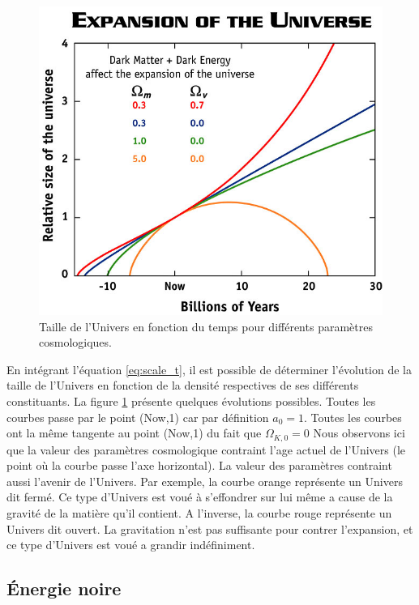\begin{figure}[bth]
        \includegraphics[width=.9\linewidth]{img/01/scale_t.jpg} 
        \caption{Taille de l'Univers en fonction du temps pour différents paramètres cosmologiques.
        }
 		\label{fig:scale_t}
\end{figure}

En intégrant l’équation \ref{eq:scale_t}, il est possible de déterminer l'évolution de la taille de l'Univers en fonction de la densité respectives de ses différents constituants.
La figure \ref{fig:scale_t} présente quelques évolutions possibles.
Toutes les courbes passe par le point (Now,1) car par définition $a_0 = 1$.
Toutes les courbes ont la même tangente au point (Now,1) du fait que $\Omega_{K,0}=0$
Nous observons ici que la valeur des paramètres cosmologique contraint l'age actuel de l'Univers (le point où la courbe passe l'axe horizontal).
La valeur des paramètres contraint aussi l'avenir de l'Univers.
Par exemple, la courbe orange représente un Univers dit fermé.
Ce type d'Univers est voué à s'effondrer sur lui même a cause de la gravité de la matière qu'il contient.
A l'inverse, la courbe rouge représente un Univers dit ouvert.
La gravitation n'est pas suffisante pour contrer l'expansion, et ce type d'Univers est voué a grandir indéfiniment.



\subsection{Énergie noire}

